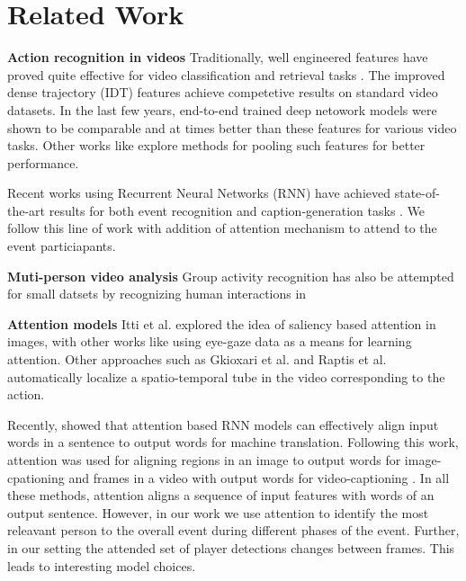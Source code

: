 \section{Related Work}


\noindent \textbf{Action recognition in videos}
Traditionally, well engineered features have proved quite effective for video
classification and retrieval tasks
\cite{Dalal_ECCV06,Jain_CVPR13,Jiang_ECCV12,Laptev_CVPR08,
Niebels_ECCV10,Oh_MVA14,Oneata_ICCV13,Peng_ECCV14,Sadanand_CVPR12,Wang_BMVC09,Wang_CVPR11}.
The improved dense trajectory (IDT) features \cite{Wang_CVPR11} achieve
competetive results on standard video datasets.  In the last few years,
end-to-end trained deep netowork models
\cite{Ji_PAMI13,Karpathy_CVPR14,Simonyan_2014,Tran_arxiv14} were shown to be comparable and
at times better than these features for various video tasks.  Other works like
\cite{Xu_2015,Zha_2015,Wang_arxiv15} explore methods for pooling such
features for better performance.

Recent works using Recurrent Neural Networks (RNN) have achieved
state-of-the-art results for both event recognition and caption-generation
tasks \cite{Donahue_arxiv14,Ng_arxiv15,Srivastava_2015,Yao_arxiv15}.
We follow this line of work with addition of attention mechanism
to attend to the event particiapants.

\noindent \textbf{Muti-person video analysis}
Group activity recognition has also be attempted for small
datsets by recognizing human interactions in
\cite{Lan_PAMI12,Choi_ICCV09,Vaswani_CVPR03,Khan_ACM05,Moore_AAAI02,Intille_CVIU01,Khodabandeh_arxiv15}

\noindent \textbf{Attention models}
Itti et al. \cite{Itti_PAMI98} explored the idea of saliency based attention in
images, with other works like \cite{Shapovalova_NIPS13} using eye-gaze data as
a means for learning attention.
Other approaches such as Gkioxari et al. \cite{Gkioxari_arxiv14} and Raptis et al. \cite{Raptis_CVPR12}
automatically localize a spatio-temporal tube in the video corresponding to the action.

Recently, \cite{Bahdnau_arxiv14} showed that
attention based RNN models can effectively align input words in a sentence to
output words for machine translation.  Following this work, attention was used
for aligning regions in an image to output words for image-cpationing
\cite{Xu_arxiv15} and frames in a video with output words for video-captioning
\cite{Yao_arxiv15}.  In all these methods, attention aligns a sequence of input
features with words of an output sentence. However, in our work we use
attention to identify the most releavant person to the overall event during
different phases of the event.  Further, in our setting the attended set of
player detections changes between frames. This leads to interesting model choices.


